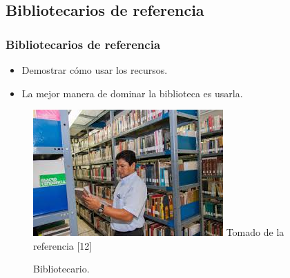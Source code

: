 \documentclass{beamer}
\begin{document}
    \subsection{Bibliotecarios de referencia}
    \begin{frame}\frametitle{Bibliotecarios de referencia}
        \begin{multicols}{2}  
            \begin{itemize}
                \item Demostrar c\'omo usar los recursos. 
                \item La mejor manera de dominar la biblioteca es usarla.  
            \end{itemize} 
             \begin{figure}
                \includegraphics[scale=0.45]{figures/bibliotecario}
                \newline
                {\tiny Tomado de la referencia [12] }
                \caption{Bibliotecario. }
            \end{figure}
        \end{multicols}       
    \end{frame}
\end{document}
